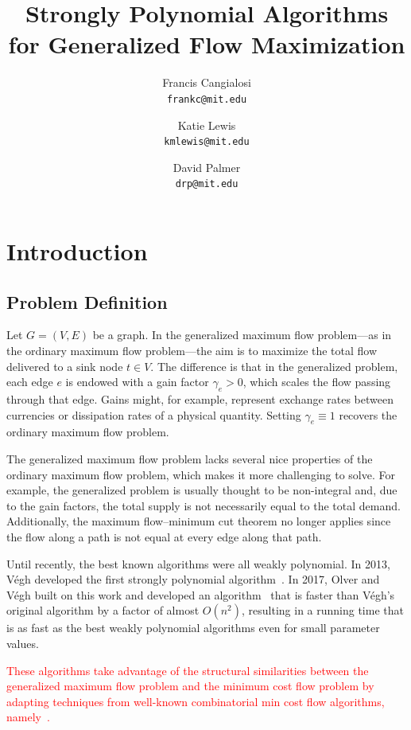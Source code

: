 \documentclass[11pt]{article}
\title{Strongly Polynomial Algorithms for Generalized Flow Maximization}
\author{Francis Cangialosi \\ \texttt{frankc@mit.edu} \and Katie Lewis \\ \texttt{kmlewis@mit.edu} \and David Palmer \\ \texttt{drp@mit.edu}}
\date{}
\theoremstyle{definition}
\theoremstyle{definition}
\theoremstyle{definition}
\newcommand{\rewrite}[1]{\textcolor{red}{#1}}
\newif\ifLAYOUTA
\begin{document}
\maketitle
\vspace{-0.1cm}

\section{Introduction}\label{sec:intro}
	\subsection{Problem Definition}\label{sec:problem}
	Let $G = (V,E)$ be a graph. In the generalized maximum flow problem---as in the
    ordinary maximum flow problem---the aim is to maximize the
	total flow delivered to a sink node $t \in V$. The difference is that in the generalized
    problem, each edge $e$ is endowed with a gain factor $\gamma_e > 0$, which scales
	the flow passing through that edge. Gains might, for example, represent
    exchange rates between currencies
	or dissipation rates of a physical quantity. Setting $\gamma_e \equiv 1$
    recovers the ordinary maximum flow problem.
    
    The generalized maximum
	flow problem lacks several nice properties of the ordinary
	maximum flow problem, which makes it more challenging to solve. For example,
	the generalized problem is usually thought to be non-integral and,
	due to the gain factors, the total supply is not necessarily equal to the total
	demand. Additionally, the maximum flow--minimum cut theorem no longer applies
	since the flow along a path is not equal at every edge along that path.
    
	Until recently, the best known algorithms were all weakly polynomial. In
	2013, Végh developed the first strongly polynomial algorithm~\cite{Vegh2013}.
    In 2017, Olver and Végh
	built on this work and developed an algorithm~\cite{Olver2017}
	that is faster than Végh's original algorithm by a factor of
	almost $O(n^2)$, resulting in a running time that is as fast as the best
	weakly polynomial algorithms even for small parameter values. 
	\ifLAYOUTA
	\else
	\rewrite{These
	algorithms take advantage of the structural similarities between the
	generalized maximum flow problem and the minimum cost flow problem by
	adapting techniques from well-known combinatorial min cost flow algorithms,
namely~\cite{Orlin1988}.}
	\fi
    
\end{document}
